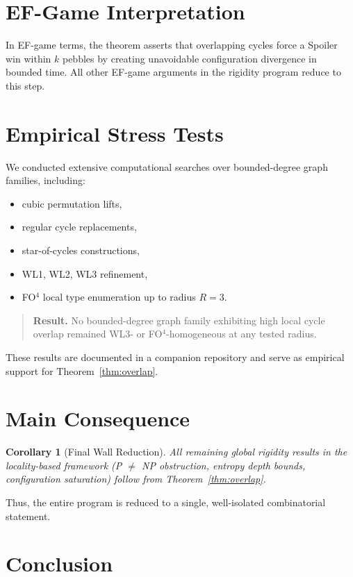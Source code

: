 \documentclass[11pt]{article}
\newtheorem{corollary}{Corollary}
\begin{document}
\section{EF-Game Interpretation}

In EF-game terms, the theorem asserts that overlapping cycles force a Spoiler win
within $k$ pebbles by creating unavoidable configuration divergence in bounded time.
All other EF-game arguments in the rigidity program reduce to this step.

\section{Empirical Stress Tests}

We conducted extensive computational searches over bounded-degree graph families,
including:
\begin{itemize}[leftmargin=2em]
\item cubic permutation lifts,
\item regular cycle replacements,
\item star-of-cycles constructions,
\item WL1, WL2, WL3 refinement,
\item FO$^4$ local type enumeration up to radius $R=3$.
\end{itemize}

\begin{quote}
\textbf{Result.} No bounded-degree graph family exhibiting high local cycle overlap
remained WL3- or FO$^4$-homogeneous at any tested radius.
\end{quote}

These results are documented in a companion repository and serve as empirical
support for Theorem~\ref{thm:overlap}.

\section{Main Consequence}

\begin{corollary}[Final Wall Reduction]
All remaining global rigidity results in the locality-based framework
(P $\neq$ NP obstruction, entropy depth bounds, configuration saturation)
follow from Theorem~\ref{thm:overlap}.
\end{corollary}

Thus, the entire program is reduced to a single, well-isolated combinatorial
statement.

\section{Conclusion}
\end{document}
